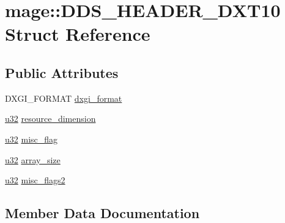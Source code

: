 \hypertarget{structmage_1_1_d_d_s___h_e_a_d_e_r___d_x_t10}{}\section{mage\+:\+:D\+D\+S\+\_\+\+H\+E\+A\+D\+E\+R\+\_\+\+D\+X\+T10 Struct Reference}
\label{structmage_1_1_d_d_s___h_e_a_d_e_r___d_x_t10}
\subsection*{Public Attributes}
\begin{DoxyCompactItemize}
\item 
D\+X\+G\+I\+\_\+\+F\+O\+R\+M\+AT \hyperlink{structmage_1_1_d_d_s___h_e_a_d_e_r___d_x_t10_a06df28f4738161963f81349e9bc8b09d}{dxgi\+\_\+format}
\item 
\hyperlink{namespacemage_af2b398bf98eb10351f49cad73fe2cc73}{u32} \hyperlink{structmage_1_1_d_d_s___h_e_a_d_e_r___d_x_t10_ab03495914b5c6b94cba4c46e54407536}{resource\+\_\+dimension}
\item 
\hyperlink{namespacemage_af2b398bf98eb10351f49cad73fe2cc73}{u32} \hyperlink{structmage_1_1_d_d_s___h_e_a_d_e_r___d_x_t10_a9e9e74202b67f9682d6231063c4bbd34}{misc\+\_\+flag}
\item 
\hyperlink{namespacemage_af2b398bf98eb10351f49cad73fe2cc73}{u32} \hyperlink{structmage_1_1_d_d_s___h_e_a_d_e_r___d_x_t10_a4a7aef871145b97e6e361e9902ef7974}{array\+\_\+size}
\item 
\hyperlink{namespacemage_af2b398bf98eb10351f49cad73fe2cc73}{u32} \hyperlink{structmage_1_1_d_d_s___h_e_a_d_e_r___d_x_t10_ac9ef55a5a45e03f484dc3896bd2fd95b}{misc\+\_\+flags2}
\end{DoxyCompactItemize}


\subsection{Member Data Documentation}
\hypertarget{structmage_1_1_d_d_s___h_e_a_d_e_r___d_x_t10_a4a7aef871145b97e6e361e9902ef7974}{}\label{structmage_1_1_d_d_s___h_e_a_d_e_r___d_x_t10_a4a7aef871145b97e6e361e9902ef7974} 
